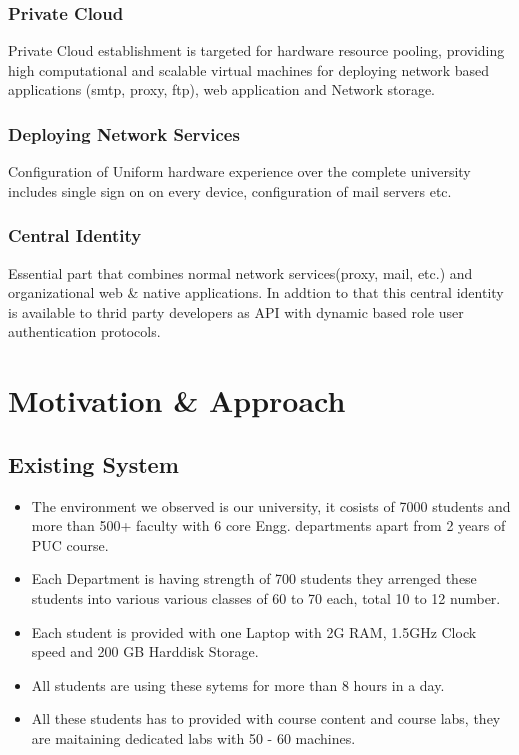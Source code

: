 \documentclass[12pt]{report}
\begin{document}
\subsection{Private Cloud}

	Private Cloud establishment is targeted for hardware resource pooling, providing high computational and scalable virtual machines for deploying network based applications (smtp, proxy, ftp), web application and Network storage.
	
\subsection{Deploying Network Services}

	Configuration of Uniform hardware experience over the complete university includes single sign on on every device, configuration of mail servers etc.
	
\subsection{Central Identity}

	Essential part that combines normal network services(proxy, mail, etc.) and organizational web \& native applications. In addtion to that this central identity is available to thrid party developers as API with dynamic based role user authentication protocols.	
	

\chapter{Motivation \& Approach}

\section{Existing System}


\begin{itemize}
	\item The environment we observed is our university, it cosists of 7000 students and more than 500+ faculty with 6 core Engg. departments apart from 2 years of PUC course.
	\item Each Department is having strength of 700 students they arrenged these students into various various classes of 60 to 70 each, total 10 to 12 number. 
	\item Each student is provided with one Laptop with 2G RAM, 1.5GHz Clock speed and 200 GB Harddisk Storage. 
	\item All students are using these sytems for more than 8 hours in a day.
	\item All these students has to provided with course content and course labs, they are maitaining dedicated labs with 50 - 60 machines.
	
\end{itemize}
\end{document}
